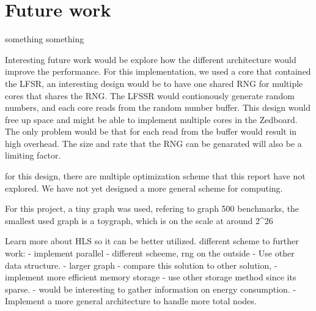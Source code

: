 \chapter{Future work} \label{futureWork}
something something

Interesting future work would be explore how the different architecture would improve the performance. For this implementation, we used a core that contained the LFSR, an interesting design would be to have one shared RNG for multiple cores that shares the RNG. The LFSSR would contionously generate random numbers, and each core reads from the random number buffer. This design would free up space and might be able to implement multiple cores in the Zedboard. The only problem would be that for each read from the buffer would result in high overhead. The size and rate that the RNG can be genarated will also be a limiting factor.

for this design, there are multiple optimization scheme that this report have not explored. We have not yet designed a more general scheme for computing. 

For this project, a tiny graph was used, refering to graph 500 benchmarks, the smallest used graph is a toygraph, which is on the scale at around 2^26

Learn more about HLS so it can be better utilized. 
different scheme to further work:
- implement parallel
- different scheeme, rng on the outside
- Use other data structure.
- larger graph
- compare this solution to other solution, 
- implement more efficient memory storage
- use other storage method since its sparse. 
- would be interesting to gather information on  energy consumption.
- Implement a more general architecture to handle more total nodes.

